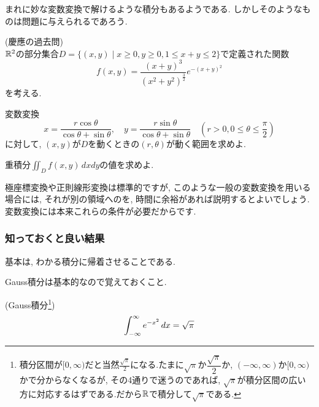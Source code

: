 まれに妙な変数変換で解けるような積分もあるようである. しかしそのようなものは問題に与えられるであろう.
\begin{egprob} (慶應の過去問)\\
$\mathbb{R}^2$の部分集合$D = \{ (x,y)\mid x\geq 0, y\geq 0, 1\leq x+y\leq 2 \}$で定義された関数
\[f(x,y) = \dfrac{(x+y)^3}{(x^2+y^2)^{\frac{3}{2}}}e^{-(x+y)^2}\]
を考える.
\ben
\item 変数変換
\[x= \dfrac{r\cos{\theta}}{\cos{\theta} + \sin{\theta}},\quad y=\dfrac{r\sin{\theta}}{\cos{\theta} + \sin{\theta}}\quad (r>0, 0\leq \theta \leq \dfrac{\pi}{2})\]
に対して, $(x,y)$が$D$を動くときの$(r,\theta)$が動く範囲を求めよ.
\item 重積分$\iint_{D} f(x,y) \, dxdy$の値を求めよ.
\een
\end{egprob}
\begin{point}
極座標変換や正則線形変換は標準的ですが, このような一般の変数変換を用いる場合には, それが別の領域へのを, 時間に余裕があれば説明するとよいでしょう. 変数変換には本来これらの条件が必要だからです.
\end{point}

\begin{egans}
\end{egans}


\clearpage
\subsubsection{知っておくと良い結果}
基本は, わかる積分に帰着させることである.

Gauss積分は基本的なので覚えておくこと.
\begin{prop} (Gauss積分\footnote{積分区間が$[0,\infty)$だと当然$\frac{\sqrt{\pi}}{2}$になる.たまに$\sqrt{\pi}$か$\dfrac{\sqrt{\pi}}{2}$か, $(-\infty,\infty)$か$[0,\infty)$かで分からなくなるが, その4通りで迷うのであれば, $\sqrt{\pi}$が積分区間の広い方に対応するはずである.だから$\mathbb{R}$で積分して$\sqrt{\pi}$である.
}) \label{prop:gauss_integral}
\[\displaystyle\int_{-\infty}^{\infty} e^{-x^2}\, dx = \sqrt{\pi}\]
\end{prop}


